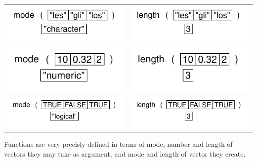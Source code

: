 \documentclass[pdflatex]{article}
\begin{document}
\begin{tabular}{cc}
\includegraphics{v_char_type} & \includegraphics{v_char_length}\\
\includegraphics{v_num_type} & \includegraphics{v_num_length}\\
\includegraphics{v_log_type} & \includegraphics{v_log_length}\\
\end{tabular}

Functions are very precisly defined in terms of mode, number and length of vectors they may take as argument, and mode and length of vector they create.
\end{document}
